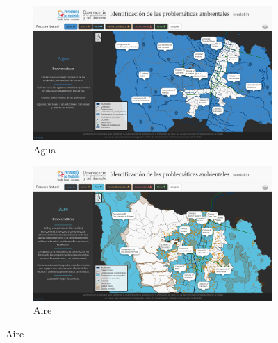 \documentclass[11pt,letterpaper]{article}
\begin{document}
\begin{figure}[hb!]
\centering
\begin{subfigure}{.49\textwidth}
	\includegraphics[width=\textwidth]{../assets/images/recurso_natural/recurso_agua.png}
	\caption{Agua}\label{fig:rAgua}
\end{subfigure}	
\hfill
\begin{subfigure}{.49\textwidth}
	\includegraphics[width=\textwidth]{../assets/images/recurso_natural/recurso_aire.png}
	\caption{Aire}\label{fig:rAire}
\end{subfigure}


\end{figure}
\end{document}
